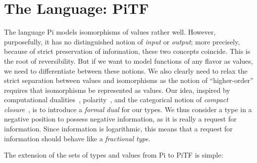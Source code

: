 \documentclass{llncs}
\newcommand{\roshan}[1]{\textsc{Roshan says:} 
  \textit{#1}
}
\begin{document}
\section{The Language: {{PiTF}} }

The language {{Pi}} models isomorphisms of values rather well.  However,
purposefully, it has no distinguished notion of \emph{input} or
\emph{output}; more precisely, because of strict preservation of information,
these two concepts coincide.  This is the root of reversibility. But if we
want to model functions of any flavor as values, we need to differentiate
between these notions. We also clearly need to relax the strict separation
between values and isomorphisms as the notion of ``higher-order'' requires
that isomorphisms be represented as values. Our idea, inspired by
computational dualities~\cite{Filinski:1989:DCI:648332.755574,Curien:2000},
polarity~\cite{Girard87tcs,10.1109/LICS.2010.23}, and the categorical notion
of \emph{compact
  closure}~\cite{Selinger:2007:DCC:1229185.1229207,Abramsky:2004:CSQ:1018438.1021878},
is to introduce a \emph{formal dual} for our types.  We thus consider a type
in a negative position to possess negative information, as it is really a
request for information.  Since information is logarithmic, this means that a
request for information should behave like a \emph{fractional type}.

%


The extension of the sets of types and values from {{Pi}} to {{PiTF}} is
simple:
\end{document}
